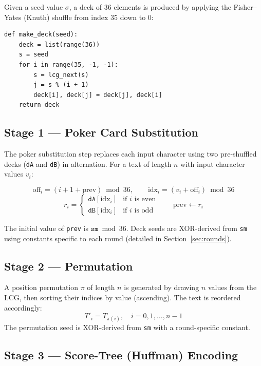 \documentclass[12pt,a4paper]{article}
\begin{document}
Given a seed value $\sigma$, a deck of 36 elements is produced by applying the Fisher--Yates (Knuth) shuffle from index 35 down to 0:

\begin{lstlisting}[caption={Deck construction via Fisher--Yates shuffle}]
def make_deck(seed):
    deck = list(range(36))
    s = seed
    for i in range(35, -1, -1):
        s = lcg_next(s)
        j = s % (i + 1)
        deck[i], deck[j] = deck[j], deck[i]
    return deck
\end{lstlisting}

\subsection{Stage 1 — Poker Card Substitution}

The poker substitution step replaces each input character using two pre-shuffled decks (\texttt{dA} and \texttt{dB}) in alternation. For a text of length $n$ with input character values $v_i$:

\[
    \text{off}_i = (i + 1 + \text{prev}) \bmod 36, \qquad
    \text{idx}_i = (v_i + \text{off}_i) \bmod 36
\]
\[
    r_i =
    \begin{cases}
        \texttt{dA}[\text{idx}_i] & \text{if } i \text{ is even} \\
        \texttt{dB}[\text{idx}_i] & \text{if } i \text{ is odd}
    \end{cases}
    \qquad \text{prev} \leftarrow r_i
\]

The initial value of \texttt{prev} is $\texttt{sm} \bmod 36$. Deck seeds are XOR-derived from \texttt{sm} using constants specific to each round (detailed in Section~\ref{sec:rounds}).

\subsection{Stage 2 — Permutation}

A position permutation $\pi$ of length $n$ is generated by drawing $n$ values from the LCG, then sorting their indices by value (ascending). The text is reordered accordingly:
\[
    T'_i = T_{\pi(i)}, \quad i = 0, 1, \ldots, n-1
\]
The permutation seed is XOR-derived from \texttt{sm} with a round-specific constant.

\subsection{Stage 3 — Score-Tree (Huffman) Encoding}
\end{document}
